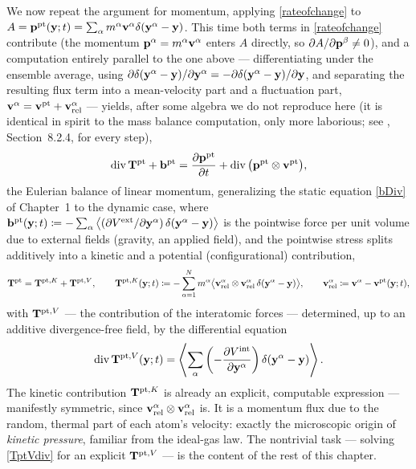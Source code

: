 We now repeat the argument for momentum, applying \eqref{rateofchange} to $A=\mathbf{p}^{\rm pt}(\mathbf{y};t)=\sum_\alpha m^\alpha\mathbf{v}^\alpha\delta(\mathbf{y}^\alpha-\mathbf{y})$. This time both terms in \eqref{rateofchange} contribute (the momentum $\mathbf{p}^\alpha=m^\alpha\mathbf{v}^\alpha$ enters $A$ directly, so $\partial A/\partial\mathbf{p}^\beta\neq0$), and a computation entirely parallel to the one above --- differentiating under the ensemble average, using $\partial\delta(\mathbf{y}^\alpha-\mathbf{y})/\partial\mathbf{y}^\alpha=-\partial\delta(\mathbf{y}^\alpha-\mathbf{y})/\partial\mathbf{y}$, and separating the resulting flux term into a mean-velocity part and a fluctuation part, $\mathbf{v}^\alpha=\mathbf{v}^{\rm pt}+\mathbf{v}^\alpha_{\rm rel}$ --- yields, after some algebra we do not reproduce here (it is identical in spirit to the mass balance computation, only more laborious; see \cite{TadmorMiller}, Section~8.2.4, for every step),
\begin{equation}\label{ikn_mombal}
	\operatorname{div}\mathbf{T}^{\rm pt} + \mathbf{b}^{\rm pt} = \frac{\partial\mathbf{p}^{\rm pt}}{\partial t} + \operatorname{div}\big(\mathbf{p}^{\rm pt}\otimes\mathbf{v}^{\rm pt}\big),
\end{equation}
the Eulerian balance of linear momentum, generalizing the static equation \eqref{bDiv} of Chapter~1 to the dynamic case, where $\mathbf{b}^{\rm pt}(\mathbf{y};t)\coloneqq-\sum_\alpha\big\langle(\partial V^{\rm ext}/\partial\mathbf{y}^\alpha)\,\delta(\mathbf{y}^\alpha-\mathbf{y})\big\rangle$ is the pointwise force per unit volume due to external fields (gravity, an applied field), and the pointwise stress splits additively into a kinetic and a potential (configurational) contribution,
\begin{equation}\label{Tptsplit}
	\mathbf{T}^{\rm pt} = \mathbf{T}^{{\rm pt},K} + \mathbf{T}^{{\rm pt},V}, \qquad \mathbf{T}^{{\rm pt},K}(\mathbf{y};t) \coloneqq -\sum_{\alpha=1}^N m^\alpha\big\langle \mathbf{v}^\alpha_{\rm rel}\otimes\mathbf{v}^\alpha_{\rm rel}\,\delta(\mathbf{y}^\alpha-\mathbf{y})\big\rangle, \qquad \mathbf{v}^\alpha_{\rm rel}\coloneqq\mathbf{v}^\alpha-\mathbf{v}^{\rm pt}(\mathbf{y};t),
\end{equation}
with $\mathbf{T}^{{\rm pt},V}$ --- the contribution of the interatomic forces --- determined, up to an additive divergence-free field, by the differential equation
\begin{equation}\label{TptVdiv}
	\operatorname{div}\mathbf{T}^{{\rm pt},V}(\mathbf{y};t) = \left\langle \sum_\alpha \left(-\frac{\partial V^{\rm int}}{\partial\mathbf{y}^\alpha}\right)\delta(\mathbf{y}^\alpha-\mathbf{y})\right\rangle.
\end{equation}
The kinetic contribution $\mathbf{T}^{{\rm pt},K}$ is already an explicit, computable expression --- manifestly symmetric, since $\mathbf{v}^\alpha_{\rm rel}\otimes\mathbf{v}^\alpha_{\rm rel}$ is. It is a momentum flux due to the random, thermal part of each atom's velocity: exactly the microscopic origin of \textit{kinetic pressure}, familiar from the ideal-gas law. The nontrivial task --- solving \eqref{TptVdiv} for an explicit $\mathbf{T}^{{\rm pt},V}$ --- is the content of the rest of this chapter.

